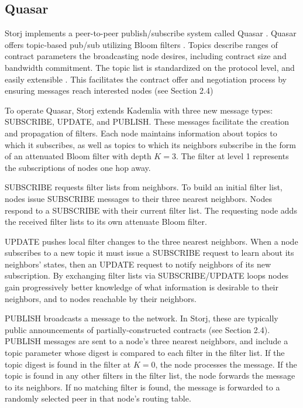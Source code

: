 \documentclass[a4paper,10pt]{article}
\begin{document}
\subsection{Quasar}
Storj implements a peer-to-peer publish/subscribe system called Quasar \cite{8}\cite{9}. Quasar offers topic-based pub/sub utilizing Bloom filters \cite{10}. Topics describe ranges of contract parameters the broadcasting node desires, including contract size and bandwidth commitment. The topic list is standardized on the protocol level, and easily extensible \cite{11}. This facilitates the contract offer and negotiation process by ensuring messages reach interested nodes (see Section 2.4)

To operate Quasar, Storj extends Kademlia with three new message types: SUBSCRIBE, UPDATE, and PUBLISH. These messages facilitate the creation and propagation of filters. Each node maintains information about topics to which it subscribes, as well as topics to which its neighbors subscribe in the form of an attenuated Bloom filter with depth $ K = 3 $. The filter at level 1 represents the subscriptions of nodes one hop away.

SUBSCRIBE requests filter lists from neighbors. To build an initial filter list, nodes issue SUBSCRIBE messages to their three nearest neighbors. Nodes respond to a SUBSCRIBE with their current filter list. The requesting node adds the received filter lists to its own attenuate Bloom filter.

UPDATE pushes local filter changes to the three nearest neighbors. When a node subscribes to a new topic it must issue a SUBSCRIBE request to learn about its neighbors’ states, then an UPDATE request to notify neighbors of its new subscription. By exchanging filter lists via SUBSCRIBE/UPDATE loops nodes gain progressively better knowledge of what information is desirable to their neighbors, and to nodes reachable by their neighbors.

PUBLISH broadcasts a message to the network. In Storj, these are typically public announcements of partially-constructed contracts (see Section 2.4). PUBLISH messages are sent to a node’s three nearest neighbors, and include a topic parameter whose digest is compared to each filter in the filter list. If the topic digest is found in the filter at $ K = 0 $, the node processes the message. If the topic is found in any other filters in the filter list, the node forwards the message to its neighbors. If no matching filter is found, the message is forwarded to a randomly selected peer in that node’s routing table.
\end{document}
